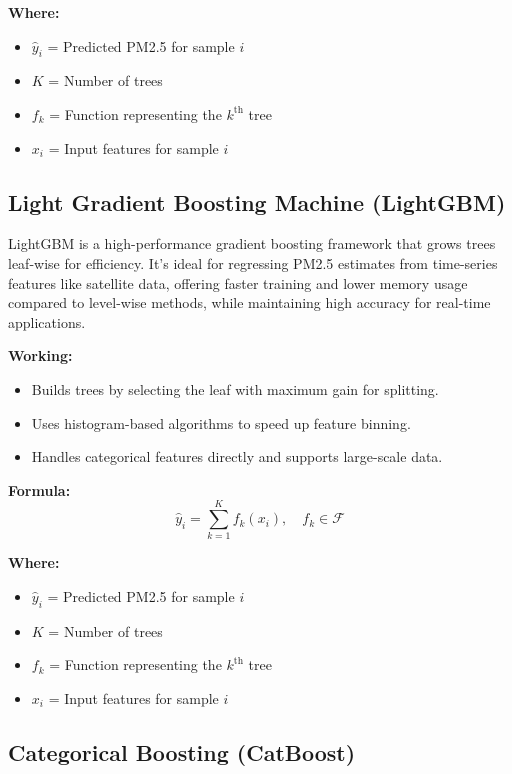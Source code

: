 \documentclass[12pt]{report}
\begin{document}
\noindent\textbf{Where:}
\begin{itemize}
    \item $\hat{y}_i$ = Predicted PM2.5 for sample $i$
    \item $K$ = Number of trees
    \item $f_k$ = Function representing the $k^{\text{th}}$ tree
    \item $x_i$ = Input features for sample $i$
\end{itemize}

\subsection{Light Gradient Boosting Machine (LightGBM)}

LightGBM is a high-performance gradient boosting framework that grows trees leaf-wise for efficiency. It's ideal for regressing PM2.5 estimates from time-series features like satellite data, offering faster training and lower memory usage compared to level-wise methods, while maintaining high accuracy for real-time applications.

\noindent\textbf{Working:}
\begin{itemize}
    \item Builds trees by selecting the leaf with maximum gain for splitting.
    \item Uses histogram-based algorithms to speed up feature binning.
    \item Handles categorical features directly and supports large-scale data.
\end{itemize}

\noindent\textbf{Formula:}
\[
\hat{y}_i = \sum_{k=1}^{K} f_k(x_i), \quad f_k \in \mathcal{F}
\]

\noindent\textbf{Where:}
\begin{itemize}
    \item $\hat{y}_i$ = Predicted PM2.5 for sample $i$
    \item $K$ = Number of trees
    \item $f_k$ = Function representing the $k^{\text{th}}$ tree
    \item $x_i$ = Input features for sample $i$
\end{itemize}

\subsection{Categorical Boosting (CatBoost)}
\end{document}
